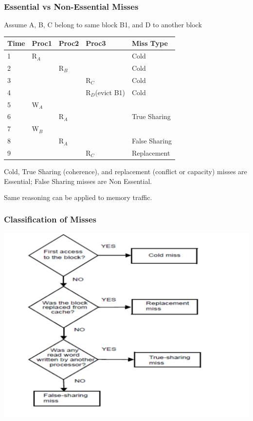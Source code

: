 \documentclass{beamer}
\renewcommand{\emph}[1]{\textcolor{structure}{#1}}
\begin{document}
\begin{frame}[fragile,t]
\frametitle{Essential vs Non-Essential Misses}

Assume A, B, C belong to same block B1, and D to another block
\begin{tabular}{lllll}
\hline
Time    & Proc1 & Proc2 & Proc3 & Miss Type \\\hline
1       & R$_A$ &       &       & Cold      \\
2       &       & R$_B$ &       & Cold      \\
3       &       &       & R$_C$ & Cold      \\
4       &       &       & R$_D$(evict B1) & Cold      \\
5       & W$_A$ &       &       &           \\
6       &       & R$_A$ &       & True Sharing      \\
7       & W$_B$ &       &       &           \\
8       &       & R$_A$ &       & False Sharing     \\
9       &       &       & R$_C$ & Replacement \\\hline
\end{tabular}
\bigskip

Cold, True Sharing (coherence), and replacement (conflict or capacity)
misses are \emph{Essential}; False Sharing misses are \alert{Non Essential}.\bigskip

Same reasoning can be applied to memory traffic.
\end{frame}

\begin{frame}[fragile,t]
\frametitle{Classification of Misses}
\includegraphics[width=59ex]{Figures/FigsInfCoherence/MissClassif}
\end{frame}
\end{document}
